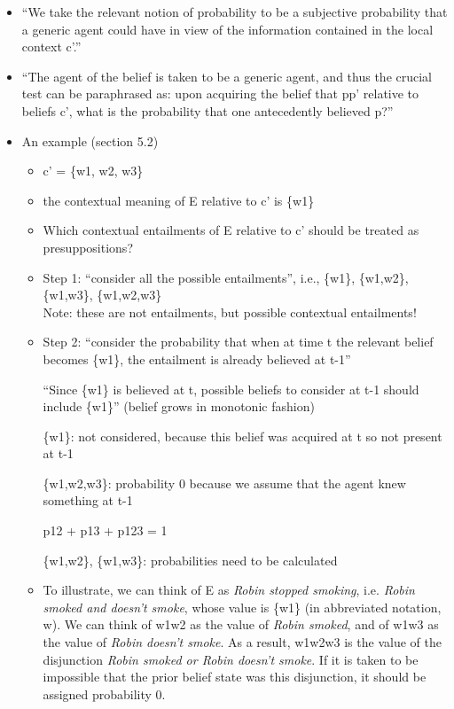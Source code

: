 \documentclass[11pt,fleqn]{article}
\newcommand{\6}{\mbox{$[\hspace*{-.6mm}[$}}
\newcommand{\9}{\mbox{$]\hspace*{-.6mm}]$}}
\begin{document}
\begin{itemize}
\item ``We take the relevant notion of probability to be a subjective probability that a generic agent could have in view of the information contained in the local context c'.''

\item ``The agent of the belief is taken to be a generic agent, and thus the crucial test can be paraphrased as: upon acquiring the belief that pp' relative to beliefs c', what is the probability that one antecedently believed p?''

\item An example (section 5.2)

\begin{itemize}

\item c' = \{w1, w2, w3\}

\item the contextual meaning of E relative to c' is  \{w1\}

\item Which contextual entailments of E relative to c' should be treated as presuppositions?

\item Step 1: ``consider all the possible entailments'', i.e., \{w1\}, \{w1,w2\}, \{w1,w3\}, \{w1,w2,w3\}
\\ Note: these are not entailments, but possible contextual entailments!

\item Step 2: ``consider the probability that when at time t the relevant belief becomes \{w1\}, the entailment is already believed at t-1''

``Since \{w1\} is believed at t, possible beliefs to consider at t-1 should include \{w1\}'' (belief grows in monotonic fashion)

\{w1\}: not considered, because this belief was acquired at t so not present at t-1

 \{w1,w2,w3\}: probability 0 because we assume that the agent knew something at t-1

 p12 + p13 + p123 = 1
  
 \{w1,w2\},  \{w1,w3\}: probabilities need to be calculated
 
 \item To illustrate, we can think of E as {\em Robin stopped smoking}, i.e. {\em Robin smoked and doesn't smoke}, whose value is \{w1\} (in abbreviated notation, w). We can think of w1w2 as the value of {\em Robin smoked}, and of w1w3 as the value of {\em Robin doesn't smoke}. As a result, w1w2w3 is the value of the disjunction {\em Robin smoked or Robin doesn't smoke}. If it is taken to be impossible that the prior belief state was this disjunction, it should be assigned probability 0.
 

\end{itemize}
\end{itemize}
\end{document}
